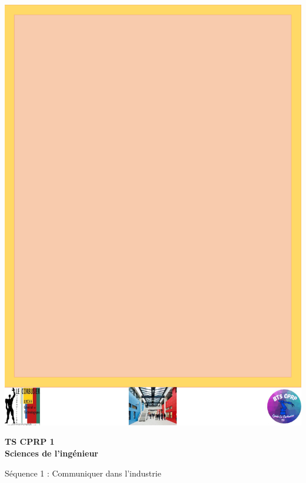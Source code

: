 \documentclass[
	11pt, %
	fleqn, %
	a4paper, %
]{LegrandOrangeBook}
\begin{document}

\titlepage %
	{\includegraphics[width=\paperwidth]{Images/background.pdf}} %
	{ %
		\centering\sffamily %
		{\Huge\bfseries TS CPRP 1 \\ Sciences de l'ingénieur\par} %
		\vspace{16pt} %
		{\LARGE Séquence 1 : Communiquer dans l'industrie\par} %
		\vspace{24pt} %
		{\huge\bfseries \par} %
	}
\end{document}
